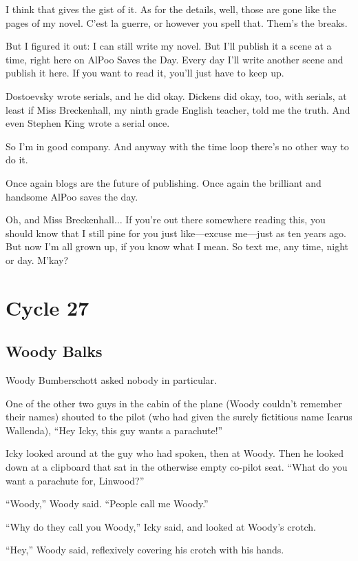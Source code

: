 I think that gives the gist of it. As for the details, well, those are gone like the pages of my novel. C'est la guerre, or however you spell that. Them's the breaks.

But I figured it out: I can still write my novel. But I'll publish it a scene at a time, right here on AlPoo Saves the Day. Every day I'll write another scene and publish it here. If you want to read it, you'll just have to keep up.

Dostoevsky wrote serials, and he did okay. Dickens did okay, too, with serials, at least if Miss Breckenhall, my ninth grade English teacher, told me the truth. And even Stephen King wrote a serial once.

So I'm in good company. And anyway with the time loop there's no other way to do it.

Once again blogs are the future of publishing. Once again the brilliant and handsome AlPoo saves the day.

Oh, and Miss Breckenhall$\ldots$ If you're out there somewhere reading this, you should know that I still pine for you just like---excuse me---just as ten years ago. But now I'm all grown up, if you know what I mean. So text me, any time, night or day. M'kay?

\part{Cycle 27}

\chapter{Woody Balks}

 Woody Bumberschott asked nobody in particular.

One of the other two guys in the cabin of the plane (Woody couldn't remember their names) shouted to the pilot (who had given the surely fictitious name Icarus Wallenda), ``Hey Icky, this guy wants a parachute!''

Icky looked around at the guy who had spoken, then at Woody. Then he looked down at a clipboard that sat in the otherwise empty co-pilot seat. ``What do you want a parachute for, Linwood?''

``Woody,'' Woody said. ``People call me Woody.''

``Why do they call you Woody,'' Icky said, and looked at Woody's crotch.

``Hey,'' Woody said, reflexively covering his crotch with his hands.

